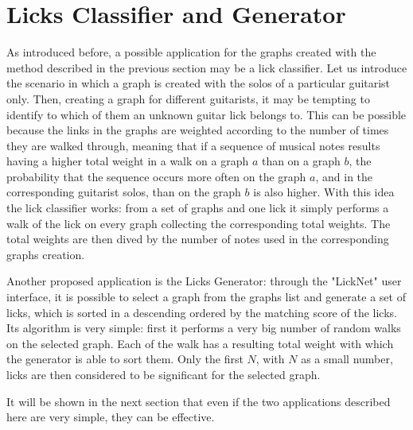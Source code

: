 \documentclass{llncs}
\begin{document}
\section{Licks Classifier and Generator}
As introduced before, a possible application for the graphs created with
the method described in the previous section may be a lick classifier.
Let us introduce the scenario in which a graph is created with the solos
of a particular guitarist only. Then, creating a graph for different
guitarists, it may be tempting to identify to which of them an unknown
guitar lick belongs to. This can be possible because the links in the
graphs are weighted according to the number of times they are walked
through, meaning that if a sequence of musical notes results having
a higher 
total weight in a walk on a graph $a$ than on a graph $b$, the probability that the sequence 
occurs more often on the graph $a$, and in the
corresponding guitarist solos, than on the graph $b$ is also higher.
With this idea the lick classifier works: from a set of graphs and one
lick it simply performs a walk of the lick on every graph collecting the
corresponding total weights. The total weights are then dived by the
number of notes used in the corresponding graphs creation.

Another proposed application is the Licks Generator: through the "LickNet" user
interface, it is possible to select a graph from the graphs list and
generate a set of licks, which is sorted in a descending ordered by
the matching score of the licks. Its algorithm is very simple: first it
performs a very big number of random walks on the selected graph. Each
of the walk has a resulting total weight with which the generator is
able to sort them. Only the first $N$, with $N$ as a small number, 
licks are then considered to be significant for the selected graph.

It will be shown in the next section that even if the two applications
described here are very simple, they can be effective.
\end{document}
